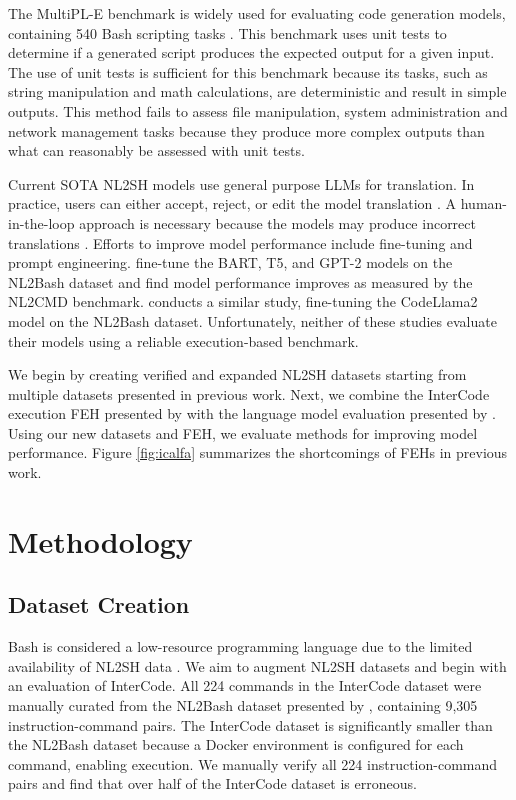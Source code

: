 \documentclass[11pt]{article}
\begin{document}
The MultiPL-E benchmark is widely used for evaluating code generation models, containing 540 Bash scripting tasks \cite{multiple}. This benchmark uses unit tests to determine if a generated script produces the expected output for a given input. The use of unit tests is sufficient for this benchmark because its tasks, such as string manipulation and math calculations, are deterministic and result in simple outputs. This method fails to assess file manipulation, system administration and network management tasks because they produce more complex outputs than what can reasonably be assessed with unit tests.

Current SOTA NL2SH models use general purpose LLMs for translation. In practice, users can either accept, reject, or edit the model translation \cite{warp,copilot}. A human-in-the-loop approach is necessary because the models may produce incorrect translations \cite{qwen}. Efforts to improve model performance include fine-tuning and prompt engineering. \citet{finetune} fine-tune the BART, T5, and GPT-2 models on the NL2Bash dataset and find model performance improves as measured by the NL2CMD benchmark. \citet{bash-assistant} conducts a similar study, fine-tuning the CodeLlama2 model on the NL2Bash dataset. Unfortunately, neither of these studies evaluate their models using a reliable execution-based benchmark.

We begin by creating verified and expanded NL2SH datasets starting from multiple datasets presented in previous work. Next, we combine the InterCode execution FEH presented by \citet{InterCode} with the language model evaluation presented by \citet{tsed}. Using our new datasets and FEH, we evaluate methods for improving model performance. Figure \ref{fig:icalfa} summarizes the shortcomings of FEHs in previous work.


\section{Methodology}
\label{sec:methodology}

\subsection{Dataset Creation}
\label{sec:dataset}
Bash is considered a low-resource programming language due to the limited availability of NL2SH data \cite{low-resource}. We aim to augment NL2SH datasets and begin with an evaluation of InterCode. All 224 commands in the InterCode dataset were manually curated from the NL2Bash dataset presented by \citet{NL2Bash}, containing 9,305 instruction-command pairs. The InterCode dataset is significantly smaller than the NL2Bash dataset because a Docker environment is configured for each command, enabling execution. We manually verify all 224 instruction-command pairs and find that over half of the InterCode dataset is erroneous.
\end{document}
